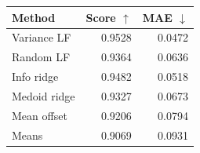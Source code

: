 \begin{tabular}{lrr}\toprule Method & Score $\uparrow$ & MAE $\downarrow$ \\ \midrule
Variance LF & 0.9528 & 0.0472 \\
Random LF & 0.9364 & 0.0636 \\
Info ridge & 0.9482 & 0.0518 \\
Medoid ridge & 0.9327 & 0.0673 \\
Mean offset & 0.9206 & 0.0794 \\
Means & 0.9069 & 0.0931 \\
\bottomrule\end{tabular}